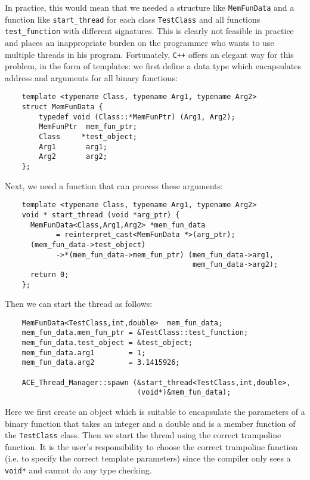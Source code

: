 \documentclass[11pt]{article}
\begin{document}
In practice, this would mean that we needed a structure like
\texttt{MemFunData} and a function like \texttt{start\_thread} for each class
\texttt{TestClass} and all functions \texttt{test\_function} with different
signatures. This is clearly not feasible in practice and places an
inappropriate burden on the programmer who wants to use multiple threads in
his program. Fortunately, \texttt{C++} offers an elegant way for this problem,
in the form of templates: we first define a data type which encapsulates
address and arguments for all binary functions:
\begin{verbatim}
    template <typename Class, typename Arg1, typename Arg2>
    struct MemFunData {
        typedef void (Class::*MemFunPtr) (Arg1, Arg2);
        MemFunPtr  mem_fun_ptr;
        Class     *test_object;
        Arg1       arg1;
        Arg2       arg2;
    };
\end{verbatim}
Next, we need a function that can process these arguments:
\begin{verbatim}
    template <typename Class, typename Arg1, typename Arg2>
    void * start_thread (void *arg_ptr) {
      MemFunData<Class,Arg1,Arg2> *mem_fun_data
            = reinterpret_cast<MemFunData *>(arg_ptr);
      (mem_fun_data->test_object)
            ->*(mem_fun_data->mem_fun_ptr) (mem_fun_data->arg1,
                                            mem_fun_data->arg2);
      return 0;
    };
\end{verbatim}
Then we can start the thread as follows:
\begin{verbatim}
    MemFunData<TestClass,int,double>  mem_fun_data;
    mem_fun_data.mem_fun_ptr = &TestClass::test_function;
    mem_fun_data.test_object = &test_object;
    mem_fun_data.arg1        = 1;
    mem_fun_data.arg2        = 3.1415926;
    
    ACE_Thread_Manager::spawn (&start_thread<TestClass,int,double>,
                               (void*)&mem_fun_data);
\end{verbatim}
Here we first create an object which is suitable to encapsulate the parameters
of a binary function that takes an integer and a double and is a member
function of the \texttt{TestClass} class. Then we start the thread using the
correct trampoline function. It is the user's responsibility to choose the
correct trampoline function (i.e. to specify the correct template parameters)
since the compiler only sees a \texttt{void*} and cannot do any type checking.
\end{document}
